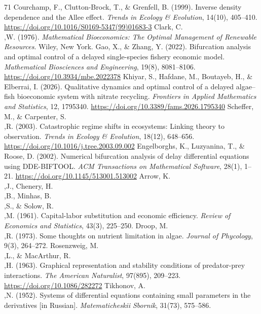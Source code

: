 \documentclass[twocolumn,10pt]{article}
\begin{document}
\begin{thebibliography}{71}
 Courchamp, F., Clutton-Brock, T., \& Grenfell, B. (1999). Inverse density dependence and the Allee effect. \textit{Trends in Ecology \& Evolution}, 14(10), 405--410. \url{https://doi.org/10.1016/S0169-5347(99)01683-3}
 Clark, C.\\,W. (1976). \textit{Mathematical Bioeconomics: The Optimal Management of Renewable Resources}. Wiley, New York.
 Gao, X., \& Zhang, Y. (2022). Bifurcation analysis and optimal control of a delayed single-species fishery economic model. \textit{Mathematical Biosciences and Engineering}, 19(8), 8081--8106. \url{https://doi.org/10.3934/mbe.2022378}
 Khiyar, S., Hafdane, M., Boutayeb, H., \& Elberrai, I. (2026). Qualitative dynamics and optimal control of a delayed algae--fish bioeconomic system with nitrate recycling. \textit{Frontiers in Applied Mathematics and Statistics}, 12, 1795340. \url{https://doi.org/10.3389/fams.2026.1795340}
 Scheffer, M., \& Carpenter, S.\\,R. (2003). Catastrophic regime shifts in ecosystems: Linking theory to observation. \textit{Trends in Ecology \& Evolution}, 18(12), 648--656. \url{https://doi.org/10.1016/j.tree.2003.09.002}
 Engelborghs, K., Luzyanina, T., \& Roose, D. (2002). Numerical bifurcation analysis of delay differential equations using DDE-BIFTOOL. \textit{ACM Transactions on Mathematical Software}, 28(1), 1--21. \url{https://doi.org/10.1145/513001.513002}
 Arrow, K.\\,J., Chenery, H.\\,B., Minhas, B.\\,S., \& Solow, R.\\,M. (1961). Capital-labor substitution and economic efficiency. \textit{Review of Economics and Statistics}, 43(3), 225--250.
 Droop, M.\\,R. (1973). Some thoughts on nutrient limitation in algae. \textit{Journal of Phycology}, 9(3), 264--272.
 Rosenzweig, M.\\,L., \& MacArthur, R.\\,H. (1963). Graphical representation and stability conditions of predator-prey interactions. \textit{The American Naturalist}, 97(895), 209--223. \url{https://doi.org/10.1086/282272}
 Tikhonov, A.\\,N. (1952). Systems of differential equations containing small parameters in the derivatives [in Russian]. \textit{Matematicheskii Sbornik}, 31(73), 575--586.



\end{thebibliography}
\end{document}
